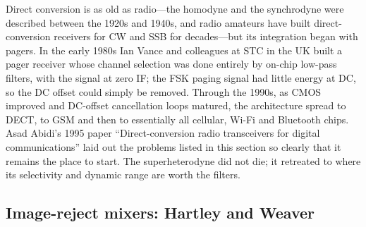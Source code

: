 \begin{history}
Direct conversion is as old as radio---the homodyne and the synchrodyne were described between the
1920s and 1940s, and radio amateurs have built direct-conversion receivers for CW and SSB for decades---but
its integration began with pagers. In the early 1980s Ian Vance and colleagues at STC in the UK
built a pager receiver whose channel selection was done entirely by on-chip low-pass filters, with the
signal at zero IF; the FSK paging signal had little energy at DC, so the DC offset could simply be
removed. Through the 1990s, as CMOS improved and DC-offset cancellation loops matured, the architecture
spread to DECT, to GSM and then to essentially all cellular, Wi-Fi and Bluetooth chips. Asad Abidi's
1995 paper ``Direct-conversion radio transceivers for digital communications'' laid out the problems
listed in this section so clearly that it remains the place to start. The superheterodyne did not die;
it retreated to where its selectivity and dynamic range are worth the filters.
\end{history}

\subsection{Image-reject mixers: Hartley and Weaver}
\label{sec:ch07:imagereject}

